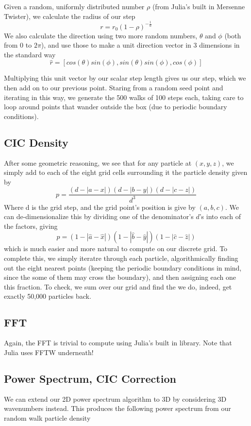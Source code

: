 \documentclass{article}
\begin{document}
Given a random, uniformly distributed number $\rho$ (from Julia's built in Mersenne Twister), we calculate the radius of our step
$$r = r_0(1-\rho)^{-\frac{1}{\alpha}}$$
We also calculate the direction using two more random numbers, $\theta$ and $\phi$ (both from 0 to $2\pi$), and use those to make a unit direction vector in 3 dimensions in the standard way
$$\hat{r} = [cos(\theta)sin(\phi),sin(\theta)sin(\phi),cos(\phi)]$$

Multiplying this unit vector by our scalar step length gives us our step, which we then add on to our previous point. Staring from a random seed point and iterating in this way, we generate the 500 walks of 100 steps each, taking care to loop around points that wander outside the box (due to periodic boundary conditions).

\subsection{CIC Density}
After some geometric reasoning, we see that for any particle at $(x,y,z)$, we simply add to each of the eight grid cells surrounding it the particle density given by
$$p = \frac{(d-|a-x|)(d-|b-y|)(d-|c-z|)}{d^3}$$
Where d is the grid step, and the grid point's position is give by $(a,b,c)$. We can de-dimensionalize this by dividing one of the denominator's $d$'s into each of the factors, giving
$$p = (1-|\hat{a}-\hat{x}|)(1-|\hat{b}-\hat{y}|)(1-|\hat{c}-\hat{z}|)$$
which is much easier and more natural to compute on our discrete grid. To complete this, we simply iteratre through each particle, algorithmically finding out the eight nearest points (keeping the periodic boundary conditions in mind, since the some of them may cross the boundary), and then assigning each one this fraction. To check, we sum over our grid and find the we do, indeed, get exactly 50,000 particles back.

\subsection{FFT}
Again, the FFT is trivial to compute using Julia's built in library. Note that Julia uses FFTW underneath!

\subsection{Power Spectrum, CIC Correction}
We can extend our 2D power spectrum algorithm to 3D by considering 3D wavenumbers instead. This produces the following power spectrum from our random walk particle density
\end{document}
